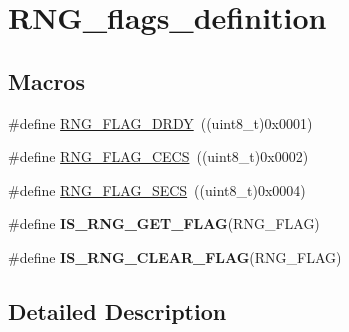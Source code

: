 \hypertarget{group___r_n_g__flags__definition}{\section{R\-N\-G\-\_\-flags\-\_\-definition}
\label{group___r_n_g__flags__definition}
}
\subsection*{Macros}
\begin{DoxyCompactItemize}
\item 
\#define \hyperlink{group___r_n_g__flags__definition_ga25845be03c05930bde3c03975eb6c44f}{R\-N\-G\-\_\-\-F\-L\-A\-G\-\_\-\-D\-R\-D\-Y}~((uint8\-\_\-t)0x0001)
\item 
\#define \hyperlink{group___r_n_g__flags__definition_ga4d4d7142b6c50bf0f421a1b668b3ff42}{R\-N\-G\-\_\-\-F\-L\-A\-G\-\_\-\-C\-E\-C\-S}~((uint8\-\_\-t)0x0002)
\item 
\#define \hyperlink{group___r_n_g__flags__definition_ga0a3a6b3d5e584f04546cbcfe0b4fdac3}{R\-N\-G\-\_\-\-F\-L\-A\-G\-\_\-\-S\-E\-C\-S}~((uint8\-\_\-t)0x0004)
\item 
\#define {\bfseries I\-S\-\_\-\-R\-N\-G\-\_\-\-G\-E\-T\-\_\-\-F\-L\-A\-G}(R\-N\-G\-\_\-\-F\-L\-A\-G)
\item 
\#define {\bfseries I\-S\-\_\-\-R\-N\-G\-\_\-\-C\-L\-E\-A\-R\-\_\-\-F\-L\-A\-G}(R\-N\-G\-\_\-\-F\-L\-A\-G)
\end{DoxyCompactItemize}


\subsection{Detailed Description}


